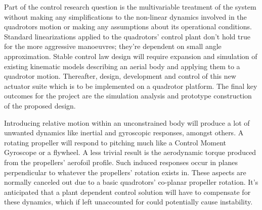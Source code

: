 \par
Part of the control research question is the multivariable treatment of the system without making any simplifications to the non-linear dynamics involved in the quadrotors motion or making any assumptions about its operational conditions. Standard linearizations applied to the quadrotors' control plant don't hold true for the more aggressive manoeuvres; they're dependent on small angle approximation. Stable control law design will require expansion and simulation of existing kinematic models describing an aerial body and applying them to a quadrotor motion. Thereafter, design, development and control of this new actuator suite which is to be implemented on a quadrotor platform. The final key outcomes for the project are the simulation analysis and prototype construction of the proposed design.
\par
Introducing relative motion within an unconstrained body will produce a lot of unwanted dynamics like inertial and gyroscopic responses, amongst others. A rotating propeller will respond to pitching much like a Control Moment Gyroscope \cite{cmg} or a flywheel. A less trivial result is the aerodynamic torque produced from the propellers' aerofoil profile. Such induced responses occur in planes perpendicular to whatever the propellers' rotation exists in. These aspects are normally canceled out due to a basic quadrotors' co-planar propeller rotation. It's anticipated that a plant dependent control solution will have to compensate for these dynamics, which if left unaccounted for could potentially cause instability. 

